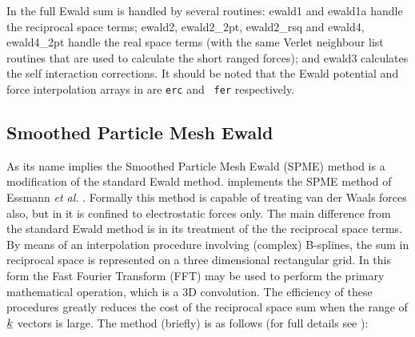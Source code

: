 In \D{} the full Ewald sum is handled by several
routines: {\sc ewald1} and {\sc ewald1a} handle the reciprocal space
terms; {\sc ewald2, ewald2\_2pt, ewald2\_rsq} and {\sc ewald4,
ewald4\_2pt} handle the real space terms (with the same
Verlet neighbour list routines that are
used to calculate the short ranged forces); and {\sc ewald3} calculates
the self interaction corrections.  It should be noted that the Ewald
potential and force interpolation arrays in \D{} are {\tt erc} and {\tt
fer} respectively.

\subsection{Smoothed Particle Mesh Ewald}
\label{spmesum}

As its name implies the Smoothed Particle Mesh Ewald (SPME)
 method is a modification of the standard Ewald
method. \D{} implements the SPME method of Essmann {\em et al.}
\cite{essmann-95a}. Formally this method is capable of treating van
der Waals forces also, but in \D{} it is confined to electrostatic
forces only. The main difference from the standard Ewald method is in
its treatment of the the reciprocal space terms. By means of an
interpolation procedure involving (complex) B-splines, the sum in
reciprocal space is represented on a three dimensional rectangular
grid. In this form the Fast Fourier Transform (FFT) may be used to
perform the primary mathematical operation, which is a 3D
convolution. The efficiency of these procedures greatly reduces the
cost of the reciprocal space sum when the range of $\mbox{$\underline{k}$}$ vectors
is large. The method (briefly) is as follows (for full details see
\cite{essmann-95a}):


